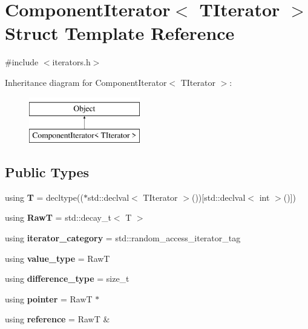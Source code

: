 \hypertarget{structComponentIterator}{}\section{Component\+Iterator$<$ T\+Iterator $>$ Struct Template Reference}
\label{structComponentIterator}


{\ttfamily \#include $<$iterators.\+h$>$}

Inheritance diagram for Component\+Iterator$<$ T\+Iterator $>$\+:\begin{figure}[H]
\begin{center}
\leavevmode
\includegraphics[height=2.000000cm]{structComponentIterator}
\end{center}
\end{figure}
\subsection*{Public Types}
\begin{DoxyCompactItemize}
\item 
\hypertarget{structComponentIterator_af45edea89e80969d8103d6ce3656cefa}{}\label{structComponentIterator_af45edea89e80969d8103d6ce3656cefa} 
using {\bfseries T} = decltype(($\ast$std\+::declval$<$ T\+Iterator $>$())\mbox{[}std\+::declval$<$ int $>$()\mbox{]})
\item 
\hypertarget{structComponentIterator_a87167d7c082b33956a1d8b27065ba5c9}{}\label{structComponentIterator_a87167d7c082b33956a1d8b27065ba5c9} 
using {\bfseries RawT} = std\+::decay\+\_\+t$<$ T $>$
\item 
\hypertarget{structComponentIterator_aad22d6594ae852e94079ffa2a5cae6de}{}\label{structComponentIterator_aad22d6594ae852e94079ffa2a5cae6de} 
using {\bfseries iterator\+\_\+category} = std\+::random\+\_\+access\+\_\+iterator\+\_\+tag
\item 
\hypertarget{structComponentIterator_a73e3b2634cef93a06ee942b0dbad9856}{}\label{structComponentIterator_a73e3b2634cef93a06ee942b0dbad9856} 
using {\bfseries value\+\_\+type} = RawT
\item 
\hypertarget{structComponentIterator_acc09c8bda29d100a3836e807287fc794}{}\label{structComponentIterator_acc09c8bda29d100a3836e807287fc794} 
using {\bfseries difference\+\_\+type} = size\+\_\+t
\item 
\hypertarget{structComponentIterator_aed6e70eb573fbe42ead1ca6b8e218592}{}\label{structComponentIterator_aed6e70eb573fbe42ead1ca6b8e218592} 
using {\bfseries pointer} = RawT $\ast$
\item 
\hypertarget{structComponentIterator_a7b37e257cad37ea01f8d1515909a71ec}{}\label{structComponentIterator_a7b37e257cad37ea01f8d1515909a71ec} 
using {\bfseries reference} = RawT \&
\end{DoxyCompactItemize}
